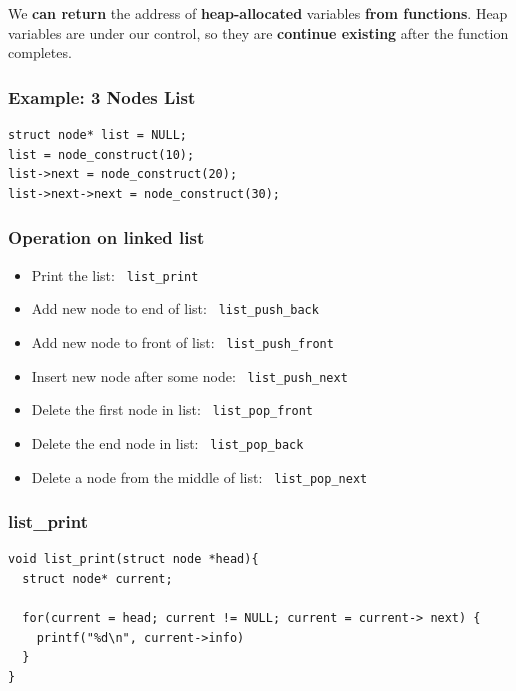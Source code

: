 \documentclass{../c-lecture}
\begin{document}
\begin{frame}
  \begin{block}{}
    We \textbf{\color{YellowOrange} can return} the address of
    \textbf{\color{LimeGreen} heap-allocated} variables
    \textbf{\color{Violet} from functions}. Heap variables are under our
    control, so they are \textbf{\color{Cyan} continue existing} after
    the function completes.
  \end{block}
\end{frame}

\begin{frame}[fragile]
  \frametitle{Example: 3 Nodes List}
  \begin{verbatim}
struct node* list = NULL;
list = node_construct(10);
list->next = node_construct(20);
list->next->next = node_construct(30);
  \end{verbatim}
\end{frame}

\begin{frame}
  \frametitle{Operation on linked list}
  \begin{itemize}
    \item Print the list: \texttt{\color{Orange} list\_print}
    \item
      Add new node to end of list:
      \texttt{\color{LimeGreen} list\_push\_back}

    \item
      Add new node to front of list:
      \texttt{\color{Yellow} list\_push\_front}

    \item
      Insert new node after some node:
      \texttt{\color{Cyan} list\_push\_next}

    \item
      Delete the first node in list:
      \texttt{\color{Violet} list\_pop\_front}

    \item
      Delete the end node in list:
      \texttt{\color{RubineRed} list\_pop\_back}

    \item
      Delete a node from the middle of list:
      \texttt{\color{RedOrange} list\_pop\_next}

  \end{itemize}
\end{frame}

\begin{frame}[fragile]
  \frametitle{list\_print}
  \begin{verbatim}
void list_print(struct node *head){
  struct node* current;

  for(current = head; current != NULL; current = current-> next) {
    printf("%d\n", current->info)
  }
}
  \end{verbatim}
\end{frame}
\end{document}
